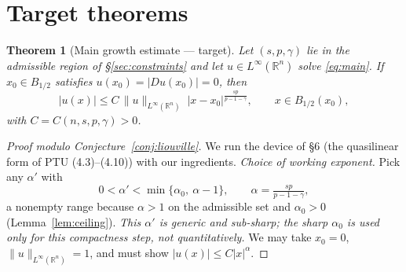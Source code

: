\documentclass[11pt]{amsart}
\theoremstyle{plain}
\newtheorem{theorem}{Theorem}[section]
\theoremstyle{definition}
\theoremstyle{remark}
\newcommand{\R}{\mathbb{R}}
\newcommand{\al}{\alpha}
\begin{document}
\section{Target theorems}\label{sec:targets}
\begin{theorem}[Main growth estimate --- target]\label{thm:main}
Let $(s,p,\gamma)$ lie in the admissible region of
\S\ref{sec:constraints} and let $u\in L^\infty(\R^n)$ solve
\eqref{eq:main}. If $x_0\in B_{1/2}$ satisfies $u(x_0)=|Du(x_0)|=0$, then
\[
  |u(x)| \le C\,\|u\|_{L^\infty(\R^n)}\;|x-x_0|^{\frac{sp}{p-1-\gamma}},
  \qquad x\in B_{1/2}(x_0),
\]
with $C=C(n,s,p,\gamma)>0$.
\end{theorem}
\begin{proof}[Proof modulo Conjecture~\ref{conj:liouville}]
We run the device of \cite{CP} \S6 (the quasilinear form of PTU
(4.3)--(4.10)) with our ingredients. \emph{Choice of working exponent.}
Pick any $\al'$ with
\[
  0<\al'<\min\{\al_0,\ \al-1\}, \qquad \al=\tfrac{sp}{p-1-\gamma},
\]
a nonempty range because $\al>1$ on the admissible set and
$\al_0>0$ (Lemma~\ref{lem:ceiling}). \emph{This $\al'$ is generic and
sub-sharp; the sharp $\al_0$ is used only for this compactness step, not
quantitatively.} We may take $x_0=0$, $\|u\|_{L^\infty(\R^n)}=1$, and must show
$|u(x)|\le C|x|^{\al}$.


\end{proof}
\end{document}
